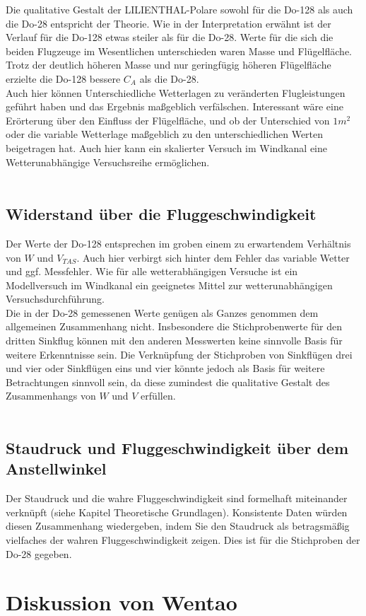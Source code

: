 Die qualitative Gestalt der LILIENTHAL-Polare sowohl für die Do-128 als auch die Do-28 entspricht der Theorie. Wie in der Interpretation erwähnt ist der Verlauf für die Do-128 etwas steiler als für die Do-28. Werte für die sich die beiden Flugzeuge im Wesentlichen unterschieden waren Masse und Flügelfläche. Trotz der deutlich höheren Masse und nur geringfügig höheren Flügelfläche erzielte die Do-128 bessere $C_{A}$ als die Do-28.\\
Auch hier können Unterschiedliche Wetterlagen zu veränderten Flugleistungen geführt haben und das Ergebnis maßgeblich verfälschen.
Interessant wäre eine Erörterung über den Einfluss der Flügelfläche, und ob der Unterschied von $1m^{2}$ oder die variable Wetterlage maßgeblich zu den unterschiedlichen Werten beigetragen hat. Auch hier kann ein skalierter Versuch im Windkanal eine Wetterunabhängige Versuchsreihe ermöglichen.\\\\

\subsection{Widerstand über die Fluggeschwindigkeit}

Der Werte der Do-128 entsprechen im groben einem zu erwartendem Verhältnis von $W$ und $V_{TAS}$. Auch hier verbirgt sich hinter dem Fehler das variable Wetter und ggf. Messfehler. Wie für alle wetterabhängigen Versuche ist ein Modellversuch im Windkanal ein geeignetes Mittel zur wetterunabhängigen Versuchsdurchführung.\\
Die in der Do-28 gemessenen Werte genügen als Ganzes genommen dem allgemeinen Zusammenhang nicht. Insbesondere die Stichprobenwerte für den dritten Sinkflug können mit den anderen Messwerten keine sinnvolle Basis für weitere Erkenntnisse sein.
Die Verknüpfung der Stichproben von Sinkflügen drei und vier oder Sinkflügen eins und vier könnte jedoch als Basis für weitere Betrachtungen sinnvoll sein, da diese zumindest die qualitative Gestalt des Zusammenhangs von $W$ und $V$ erfüllen.\\\\

\subsection{Staudruck und Fluggeschwindigkeit über dem Anstellwinkel}
Der Staudruck und die wahre Fluggeschwindigkeit sind formelhaft miteinander verknüpft (siehe Kapitel Theoretische Grundlagen). Konsistente Daten würden diesen Zusammenhang wiedergeben, indem Sie den Staudruck als betragsmäßig vielfaches der wahren Fluggeschwindigkeit zeigen. Dies ist für die Stichproben der Do-28 gegeben.
\newpage

\section{Diskussion von Wentao}
\newpage